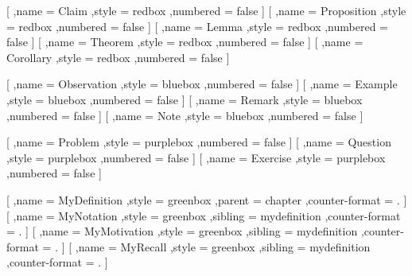         [
            ,name = Claim
            ,style = redbox
            ,numbered = false
        ]
        [
            ,name = Proposition
            ,style = redbox
            ,numbered = false
        ]
        [
            ,name = Lemma
            ,style = redbox
            ,numbered = false
        ]
        [
            ,name = Theorem
            ,style = redbox
            ,numbered = false
        ]
        [
            ,name = Corollary
            ,style = redbox
            ,numbered = false
        ]

        [
            ,name = Observation
            ,style = bluebox
            ,numbered = false
        ]
        [
            ,name = Example
            ,style = bluebox
            ,numbered = false
        ]
        [
            ,name = Remark
            ,style = bluebox
            ,numbered = false
        ]
        [
            ,name = Note
            ,style = bluebox
            ,numbered = false
        ]

        [
            ,name = Problem
            ,style = purplebox
            ,numbered = false
        ]
        [
            ,name = Question
            ,style = purplebox
            ,numbered = false
        ]
        [
            ,name = Exercise
            ,style = purplebox
            ,numbered = false
        ]

        [
            ,name = MyDefinition
            ,style = greenbox
            ,parent = chapter
            ,counter-format = .
        ]
        [
            ,name = MyNotation
            ,style = greenbox
            ,sibling = mydefinition
            ,counter-format = .
        ]
        [
            ,name = MyMotivation
            ,style = greenbox
            ,sibling = mydefinition
            ,counter-format = .
        ]
        [
            ,name = MyRecall
            ,style = greenbox
            ,sibling = mydefinition
            ,counter-format = .
        ]

